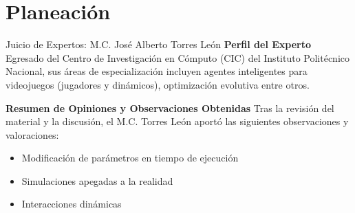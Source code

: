 \section{Planeación}

\begin{frame}{Juicio de Expertos: M.C. José Alberto Torres León}
  \textbf{Perfil del Experto}
  \RaggedRight%
  \scriptsize
  Egresado del Centro de Investigación en Cómputo (CIC) del Instituto Politécnico Nacional, sus áreas de especialización
  incluyen agentes inteligentes para videojuegos (jugadores y dinámicos), optimización evolutiva entre otros.

  \bigskip

  \textbf{Resumen de Opiniones y Observaciones Obtenidas}
  \RaggedRight%
  \scriptsize
  Tras la revisión del material y la discusión, el M.C. Torres León aportó las siguientes observaciones y valoraciones:
  \begin{itemize}
    \item Modificación de parámetros en tiempo de ejecución
    \item Simulaciones apegadas a la realidad
    \item Interacciones dinámicas
  \end{itemize}
\end{frame}

